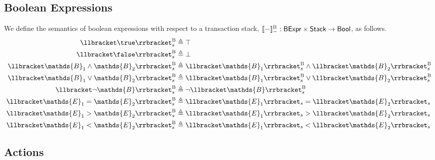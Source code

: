 \subsection{Boolean Expressions}

We define the semantics of boolean expressions with respect to a transaction stack, $\llbracket - \rrbracket_-^\textsc{B} : \mathsf{BExpr} \times \mathsf{Stack} \rightarrow \mathsf{Bool}$, as follows.
\begin{align*}
\llbracket \true \rrbracket_s^\textsc{B} &\triangleq \top \\
\llbracket \false \rrbracket_s^\textsc{B} &\triangleq \bot \\
\llbracket \mathds{B}_1 \land \mathds{B}_2 \rrbracket_s^\textsc{B} &\triangleq \llbracket \mathds{B}_1 \rrbracket_s^\textsc{B} \land \llbracket \mathds{B}_2 \rrbracket_s^\textsc{B} \\
\llbracket \mathds{B}_1 \lor \mathds{B}_2 \rrbracket_s^\textsc{B} &\triangleq \llbracket \mathds{B}_1 \rrbracket_s^\textsc{B} \lor \llbracket \mathds{B}_2 \rrbracket_s^\textsc{B} \\
\llbracket \lnot \mathds{B} \rrbracket_s^\textsc{B} &\triangleq \lnot \llbracket \mathds{B} \rrbracket_s^\textsc{B} \\
\llbracket \mathds{E}_1 = \mathds{E}_2 \rrbracket_s^\textsc{B} &\triangleq \llbracket \mathds{E}_1 \rrbracket_s = \llbracket \mathds{E}_2 \rrbracket_s \\
\llbracket \mathds{E}_1 > \mathds{E}_2 \rrbracket_s^\textsc{B} &\triangleq \llbracket \mathds{E}_1 \rrbracket_s > \llbracket \mathds{E}_2 \rrbracket_s \\
\llbracket \mathds{E}_1 < \mathds{E}_2 \rrbracket_s^\textsc{B} &\triangleq \llbracket \mathds{E}_1 \rrbracket_s < \llbracket \mathds{E}_2 \rrbracket_s
\end{align*}

\subsection{Actions}

